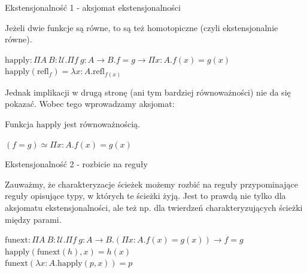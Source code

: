 \documentclass{beamer}
\newcommand{\U}{\mathcal{U}}
\newcommand{\refl}[1]{\text{refl}_{#1}}
\newcommand{\happly}{\text{happly}}
\newcommand{\funext}{\text{funext}}
\begin{document}
\begin{frame}{Ekstensjonalność 1 - aksjomat ekstensjonalności}

Jeżeli dwie funkcje są równe, to są też homotopiczne (czyli ekstensjonalnie równe).

\begin{definition}[2.9.2]
$\happly: \Pi A\ B : \U. \Pi f\ g : A \to B. f = g \to \Pi x : A. f(x) = g(x)$ \\
$\happly(\refl{f}) = \lambda x : A. \refl{f(x)}$
\end{definition}

Jednak implikacji w drugą stronę (ani tym bardziej równoważności) nie da się pokazać. Wobec tego wprowadzamy aksjomat:

\begin{definition}
Funkcja $\happly$ jest równoważnością.
\end{definition}

\begin{corollary}
$(f = g) \simeq \Pi x : A. f(x) = g(x)$
\end{corollary}

\end{frame}

\begin{frame}{Ekstensjonalność 2 - rozbicie na reguły}

Zauważmy, że charakteryzacje ścieżek możemy rozbić na reguły przypominające reguły opisujące typy, w których te ścieżki żyją. Jest to prawdą nie tylko dla aksjomatu ekstensjonalności, ale też np. dla twierdzeń charakteryzujących ścieżki między parami.

\begin{corollary}
$\funext : \Pi A\ B : \U. \Pi f\ g : A \to B. (\Pi x : A. f(x) = g(x)) \to f = g$ \\

$\happly(\funext(h), x) = h(x)$ \\

$\funext(\lambda x : A. \happly(p, x)) = p$
\end{corollary}

\end{frame}
\end{document}
